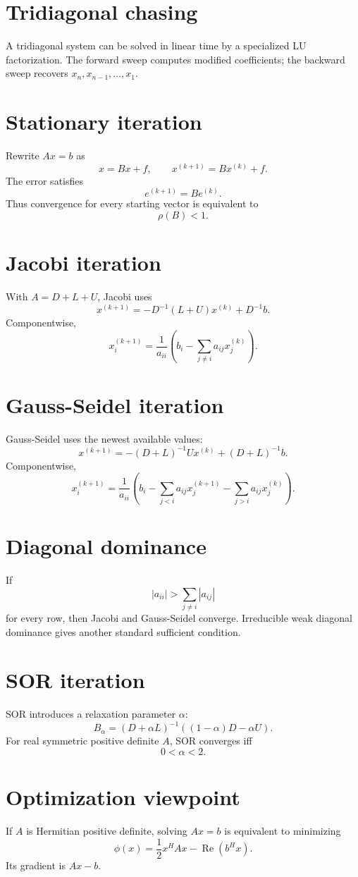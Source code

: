 \section{Tridiagonal chasing}
A tridiagonal system can be solved in linear time by a specialized LU factorization.  The forward sweep computes modified coefficients; the backward sweep recovers \(x_n,x_{n-1},\ldots,x_1\).

\section{Stationary iteration}
Rewrite \(Ax=b\) as
\[
  x=Bx+f,\qquad x^{(k+1)}=Bx^{(k)}+f.
\]
The error satisfies
\[
  e^{(k+1)}=Be^{(k)}.
\]
Thus convergence for every starting vector is equivalent to
\[
  \rho(B)<1.
\]

\section{Jacobi iteration}
With \(A=D+L+U\), Jacobi uses
\[
  x^{(k+1)}=-D^{-1}(L+U)x^{(k)}+D^{-1}b.
\]
Componentwise,
\[
  x_i^{(k+1)}=\frac{1}{a_{ii}}\left(b_i-\sum_{j\ne i}a_{ij}x_j^{(k)}\right).
\]

\section{Gauss-Seidel iteration}
Gauss-Seidel uses the newest available values:
\[
  x^{(k+1)}=-(D+L)^{-1}Ux^{(k)}+(D+L)^{-1}b.
\]
Componentwise,
\[
  x_i^{(k+1)}=\frac{1}{a_{ii}}\left(b_i-\sum_{j<i}a_{ij}x_j^{(k+1)}-\sum_{j>i}a_{ij}x_j^{(k)}\right).
\]

\section{Diagonal dominance}
If
\[
  |a_{ii}|>\sum_{j\ne i}|a_{ij}|
\]
for every row, then Jacobi and Gauss-Seidel converge.  Irreducible weak diagonal dominance gives another standard sufficient condition.

\section{SOR iteration}
SOR introduces a relaxation parameter \(\alpha\):
\[
  B_\alpha=(D+\alpha L)^{-1}((1-\alpha)D-\alpha U).
\]
For real symmetric positive definite \(A\), SOR converges iff
\[
  0<\alpha<2.
\]

\section{Optimization viewpoint}
If \(A\) is Hermitian positive definite, solving \(Ax=b\) is equivalent to minimizing
\[
  \phi(x)=\frac12 x^H A x-\operatorname{Re}(b^H x).
\]
Its gradient is \(Ax-b\).

